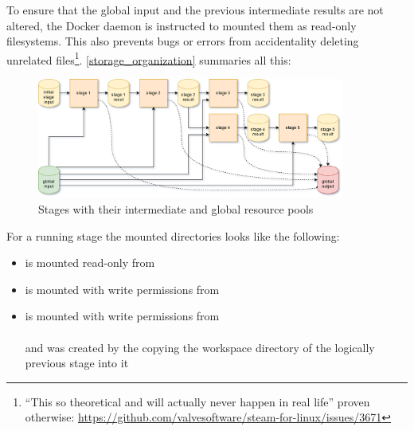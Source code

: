 To ensure that the global input and the previous intermediate results are not altered, the Docker daemon is instructed to mounted them as read-only filesystems.
This also prevents bugs or errors from accidentality deleting unrelated files\footnote{\enquote{This so theoretical and will actually never happen in real life} proven otherwise: \url{https://github.com/valvesoftware/steam-for-linux/issues/3671}}.
\autoref{storage_organization} summaries all this:


\begin{figure}[H]
	\centering
	\includegraphics[width=0.9\textwidth]{stage-storage.png}
	\caption{Stages with their intermediate and global resource pools}
	\label{storage_organization}
\end{figure}

For a running stage the mounted directories looks like the following:

\begin{itemize}
	\item {} is mounted read-only from \\ 
	\item {} is mounted with write permissions from \\ 
	\item {} is mounted with write permissions from \\  \\
	and was created by the copying the workspace directory of the logically previous stage into it
\end{itemize}





